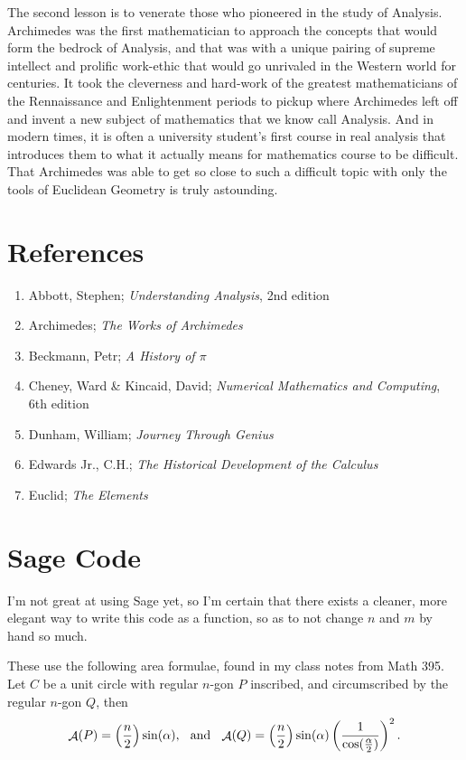 \documentclass[letterpaper, 12pt]{amsart}
\DeclareMathOperator{\A}{\mathcal{A}}
\theoremstyle{definition}  %
\begin{document}
	The second lesson is to venerate those who pioneered in the study of Analysis.
	Archimedes was the first mathematician to approach the concepts that would form the bedrock of Analysis, and that was with a unique pairing of supreme intellect and prolific work-ethic that would go unrivaled in the Western world for centuries.
	It took the cleverness and hard-work of the greatest mathematicians of the Rennaissance and Enlightenment periods to pickup where Archimedes left off and invent a new subject of mathematics that we know call Analysis.
	And in modern times, it is often a university student's first course in real analysis that introduces them to what it actually means for mathematics course to be difficult.
	That Archimedes was able to get so close to such a difficult topic with only the tools of Euclidean Geometry is truly astounding.
	\newpage

	\appendix

	\section{References}
	\label{sec:references}
	\begin{enumerate}
		\item Abbott, Stephen; \textit{Understanding Analysis}, 2nd edition
		\item Archimedes; \textit{The Works of Archimedes}
		\item Beckmann, Petr; \textit{A History of $\pi$}
		\item Cheney, Ward \& Kincaid, David; \textit{Numerical Mathematics and Computing}, 6th edition
		\item Dunham, William; \textit{Journey Through Genius}
		\item Edwards Jr., C.H.; \textit{The Historical Development of the Calculus}
		\item Euclid; \textit{The Elements}
	\end{enumerate}

	\section{Sage Code}
	\label{sec:sage_code}
	I'm not great at using Sage yet, so I'm certain that there exists a cleaner, more elegant way to write this code as a function, so as to not change $n$ and $m$ by hand so much.

	These use the following area formulae, found in my class notes from Math 395.
	Let $C$ be a unit circle with regular $n$-gon $P$ inscribed, and circumscribed by the regular $n$-gon $Q$, then \[ \A(P) = \left(\frac{n}{2} \right) \sin(\alpha), \hspace{2.5mm} \text{and} \hspace{2.5mm} \A(Q) = \left(\frac{n}{2} \right)\sin(\alpha)\left(\frac{1}{\cos(\tfrac{\alpha}{2})}\right)^{2}. \]
\end{document}
